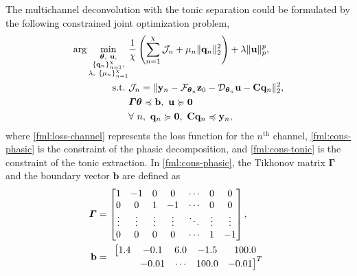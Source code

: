 \documentclass[10pt,conference]{ieeeconf}
\begin{document}
The multichannel deconvolution with the tonic separation could be formulated by the following constrained joint optimization problem,
\begin{subequations} \label{fml:the:optimization}
  \renewcommand{\theequation}
  {\theparentequation-\arabic{equation}}
  \begin{align}
  \arg\min\limits_{\substack{\boldsymbol{\theta},~\mathbf{u}, \\ \{\mathbf{q}_n\}_{n=1}^{\chi}, \\ \lambda,~\{\mu_n\}_{n=1}^{\chi}}} & \frac{1}{\chi} \left( \sum_{n=1}^{\chi} \mathcal{J}_n + \mu_n \lVert \mathbf{q}_n \rVert_2^2 \right) + \lambda \lVert \mathbf{u} \rVert^p_p, \\
  \mathrm{s.t.}~&\mathcal{J}_n = \lVert \mathbf{y}_n - \mathcal{F}_{\boldsymbol{\theta}_n} \mathbf{z}_{0} - \mathcal{D}_{\boldsymbol{\theta}_n} \mathbf{u} - \mathbf{C} \mathbf{q}_n \rVert^2_2, \label{fml:loss-channel}\\
  & \boldsymbol{\Gamma} \boldsymbol{\theta} \preccurlyeq \mathbf{b},~ \mathbf{u} \succcurlyeq \mathbf{0} \label{fml:cons-phasic}\\
  & \forall~n,~\mathbf{q}_n \succcurlyeq \mathbf{0},~\mathbf{C}\mathbf{q}_n \preccurlyeq \mathbf{y}_n, \label{fml:cons-tonic}
  \end{align}
\end{subequations}
where \eqref{fml:loss-channel} represents the loss function for the $n^{\mathrm{th}}$ channel, \eqref{fml:cons-phasic} is the constraint of the phasic decomposition, and \eqref{fml:cons-tonic} is the constraint of the tonic extraction. In \eqref{fml:cons-phasic}, the Tikhonov matrix $\boldsymbol{\Gamma}$ and the boundary vector $\mathbf{b}$ are defined as
\begin{subequations} \label{fml:the:constraint}
  \renewcommand{\theequation}
  {\theparentequation-\arabic{equation}}
  \begin{align}
  \boldsymbol{\Gamma} &= \begin{bmatrix}
  1 & -1 & 0 & 0 & \cdots & 0 & 0 \\
  0 & 0 & 1 & -1 & \cdots & 0 & 0 \\
  \vdots & \vdots & \vdots & \vdots & \ddots & \vdots & \vdots \\
  0 & 0 & 0 & 0 & \cdots & 1 & -1
  \end{bmatrix}, \\
  \mathbf{b} &= 
    \begin{array}{ccccc}
      \big[1.4 & -0.1 & 6.0 & -1.5 & 100.0 \\
      & -0.01 & \cdots & 100.0 & -0.01 \big]^T
    \end{array}  
  \end{align}
\end{subequations}
\end{document}
